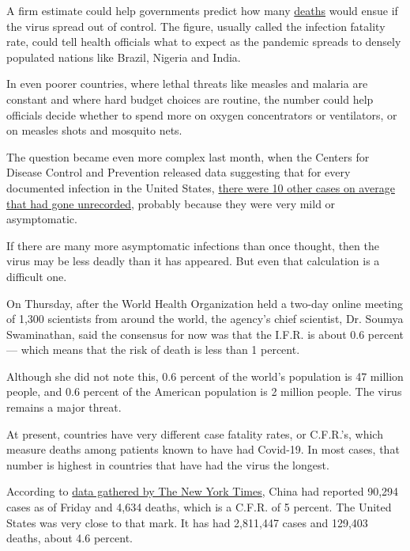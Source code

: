 A firm estimate could help governments predict how many
\href{https://www.nytimes3xbfgragh.onion/2020/07/22/us/florida-mother-2-children-covid-19.html}{deaths}
would ensue if the virus spread out of control. The figure, usually
called the infection fatality rate, could tell health officials what to
expect as the pandemic spreads to densely populated nations like Brazil,
Nigeria and India.

In even poorer countries, where lethal threats like measles and malaria
are constant and where hard budget choices are routine, the number could
help officials decide whether to spend more on oxygen concentrators or
ventilators, or on measles shots and mosquito nets.

The question became even more complex last month, when the Centers for
Disease Control and Prevention released data suggesting that for every
documented infection in the United States,
\href{https://www.cdc.gov/coronavirus/2019-ncov/cases-updates/commercial-lab-surveys.html}{there
were 10 other cases on average that had gone unrecorded}, probably
because they were very mild or asymptomatic.

If there are many more asymptomatic infections than once thought, then
the virus may be less deadly than it has appeared. But even that
calculation is a difficult one.

On Thursday, after the World Health Organization held a two-day online
meeting of 1,300 scientists from around the world, the agency's chief
scientist, Dr. Soumya Swaminathan, said the consensus for now was that
the I.F.R. is about 0.6 percent --- which means that the risk of death
is less than 1 percent.

Although she did not note this, 0.6 percent of the world's population is
47 million people, and 0.6 percent of the American population is 2
million people. The virus remains a major threat.

At present, countries have very different case fatality rates, or
C.F.R.'s, which measure deaths among patients known to have had
Covid-19. In most cases, that number is highest in countries that have
had the virus the longest.

According to
\href{https://www.nytimes3xbfgragh.onion/interactive/2020/world/coronavirus-maps.html}{data
gathered by The New York Times}, China had reported 90,294 cases as of
Friday and 4,634 deaths, which is a C.F.R. of 5 percent. The United
States was very close to that mark. It has had 2,811,447 cases and
129,403 deaths, about 4.6 percent.

